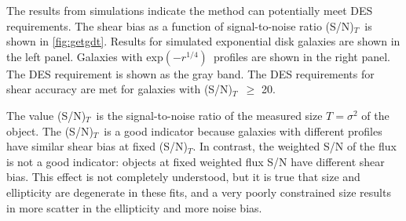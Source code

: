 \documentclass[12pt]{article}
\newcommand{\devprof}{exp$(-r^{1/4})$}
\newcommand{\sncut}{20}
\newcommand{\snsize}{(S/N)$_{T}$}
\begin{document}
The results from simulations indicate the method can potentially meet DES
requirements.  The shear bias as a function of signal-to-noise ratio \snsize\
is shown in \ref{fig:getgdt}.  Results for simulated exponential disk galaxies
are shown in the left panel.  Galaxies with \devprof\ profiles are shown in the
right panel.  The DES requirement is shown as the gray band.  The DES
requirements for shear accuracy are met for galaxies with \snsize\ $\geq$
\sncut.  

The value \snsize\ is the signal-to-noise ratio of the measured size
$T=\sigma^2$ of the object.  The \snsize\ is a good indicator because galaxies
with different profiles have similar shear bias at fixed \snsize.  In contrast,
the weighted S/N of the flux is not a good indicator: objects at fixed weighted
flux S/N have different shear bias.  This effect is not completely understood,
but it is true that size and ellipticity are degenerate in these fits, and a
very poorly constrained size results in more scatter in the ellipticity and
more noise bias.
\end{document}
